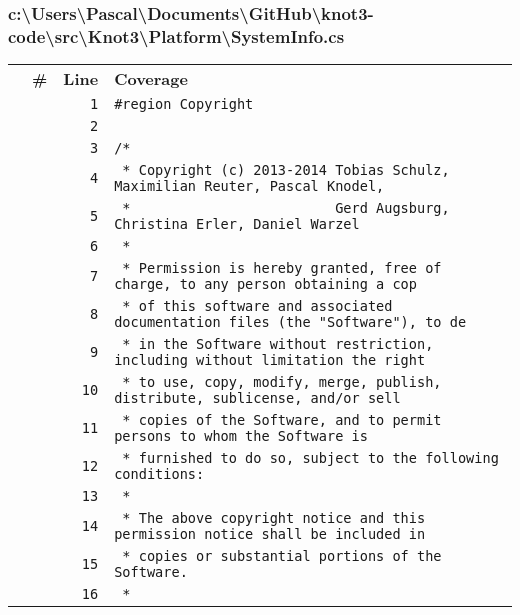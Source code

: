 \documentclass[a4paper,10pt]{article}
\begin{document}
\subsubsection{c:\textbackslash Users\textbackslash Pascal\textbackslash Documents\textbackslash GitHub\textbackslash knot3-code\textbackslash src\textbackslash Knot3\textbackslash Platform\textbackslash SystemInfo.cs}
\begin{longtable}[l]{lrrl}
\textbf{} & \textbf{\#} & \textbf{Line} & \textbf{Coverage}\\
\cellcolor{gray} &  & \verb~1~ & \verb~#region Copyright~\\
\cellcolor{gray} &  & \verb~2~ & \verb~~\\
\cellcolor{gray} &  & \verb~3~ & \verb~/*~\\
\cellcolor{gray} &  & \verb~4~ & \verb~ * Copyright (c) 2013-2014 Tobias Schulz, Maximilian Reuter, Pascal Knodel,~\\
\cellcolor{gray} &  & \verb~5~ & \verb~ *                         Gerd Augsburg, Christina Erler, Daniel Warzel~\\
\cellcolor{gray} &  & \verb~6~ & \verb~ *~\\
\cellcolor{gray} &  & \verb~7~ & \verb~ * Permission is hereby granted, free of charge, to any person obtaining a cop~\\
\cellcolor{gray} &  & \verb~8~ & \verb~ * of this software and associated documentation files (the "Software"), to de~\\
\cellcolor{gray} &  & \verb~9~ & \verb~ * in the Software without restriction, including without limitation the right~\\
\cellcolor{gray} &  & \verb~10~ & \verb~ * to use, copy, modify, merge, publish, distribute, sublicense, and/or sell~\\
\cellcolor{gray} &  & \verb~11~ & \verb~ * copies of the Software, and to permit persons to whom the Software is~\\
\cellcolor{gray} &  & \verb~12~ & \verb~ * furnished to do so, subject to the following conditions:~\\
\cellcolor{gray} &  & \verb~13~ & \verb~ *~\\
\cellcolor{gray} &  & \verb~14~ & \verb~ * The above copyright notice and this permission notice shall be included in ~\\
\cellcolor{gray} &  & \verb~15~ & \verb~ * copies or substantial portions of the Software.~\\
\cellcolor{gray} &  & \verb~16~ & \verb~ *~\\

\end{longtable}
\end{document}
